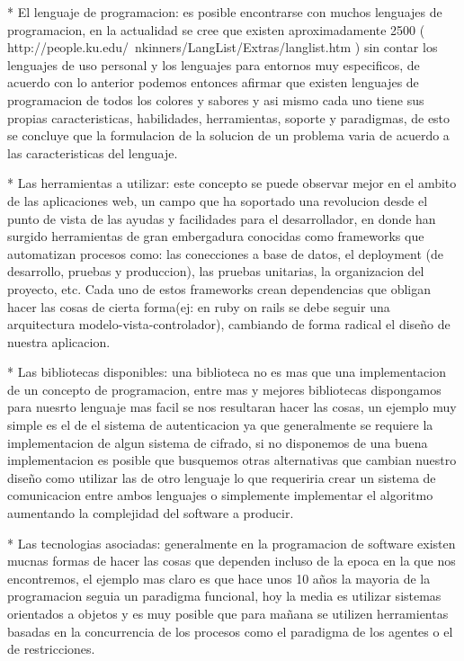 * El lenguaje de programacion: es posible encontrarse con muchos lenguajes de programacion, en la actualidad se cree que existen aproximadamente 2500 ( http://people.ku.edu/~nkinners/LangList/Extras/langlist.htm ) sin contar los lenguajes de uso personal y los lenguajes para entornos muy especificos, de acuerdo con lo anterior podemos entonces afirmar que existen lenguajes de programacion de todos los colores y sabores y asi mismo cada uno tiene sus propias caracteristicas, habilidades, herramientas, soporte y paradigmas, de esto se concluye que la formulacion de la solucion de un problema varia de acuerdo a las caracteristicas del lenguaje.

* Las herramientas a utilizar: este concepto se puede observar mejor en el ambito de las aplicaciones web, un campo que ha soportado una revolucion desde el punto de vista de las ayudas y facilidades para el desarrollador, en donde han surgido herramientas de gran embergadura conocidas como frameworks que automatizan procesos como: las conecciones a base de datos, el deployment (de desarrollo, pruebas y produccion), las pruebas unitarias, la organizacion del proyecto, etc. Cada uno de estos frameworks crean dependencias que obligan hacer las cosas de cierta forma(ej: en ruby on rails se debe seguir una arquitectura modelo-vista-controlador), cambiando de forma radical el diseño de nuestra aplicacion.

* Las bibliotecas disponibles: una biblioteca no es mas que una implementacion de un concepto de programacion, entre mas y mejores bibliotecas dispongamos para nuesrto lenguaje mas facil se nos resultaran hacer las cosas, un ejemplo muy simple es el de el sistema de autenticacion ya que generalmente se requiere la implementacion de algun sistema de cifrado, si no disponemos de una buena implementacion es posible que busquemos otras alternativas que cambian nuestro diseño como utilizar las de otro lenguaje lo que requeriria crear un sistema de comunicacion entre ambos lenguajes o simplemente implementar el algoritmo aumentando la complejidad del software a producir.

* Las tecnologias asociadas: generalmente en la programacion de software existen mucnas formas de hacer las cosas que dependen incluso de la epoca en la que nos encontremos, el ejemplo mas claro es que hace unos 10 años la mayoria de la programacion seguia un paradigma funcional, hoy la media es utilizar sistemas orientados a objetos y es muy posible que para mañana se utilizen herramientas basadas en la concurrencia de los procesos como el paradigma de los agentes o el de restricciones.

